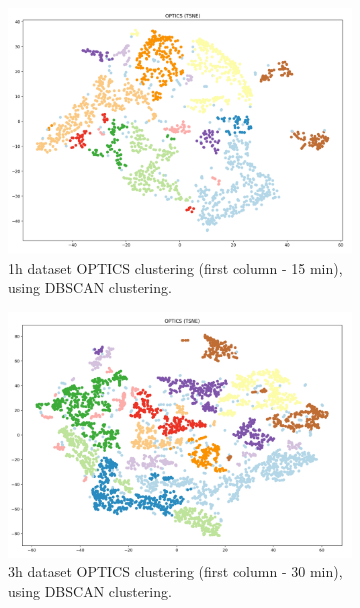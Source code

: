 \begin{figure}[H]
  \centering
  \begin{subfigure}{.5\textwidth}\captionsetup{width=.8\linewidth}
    \centering
    \includegraphics[width=1\textwidth]{./images/clusteringResults/1h-1-OPTICS.png}
  \caption{1h dataset OPTICS clustering (first column - 15 min), using DBSCAN clustering.}
  \end{subfigure}%
  \hfill
  \begin{subfigure}{.5\textwidth}\captionsetup{width=.8\linewidth}
    \centering
    \includegraphics[width=1\textwidth]{./images/clusteringResults/3h-1-OPTICS.png}
    \caption{3h dataset OPTICS clustering (first column - 30 min), using DBSCAN clustering.}
  \end{subfigure}
  \caption{}
  \label{figure:OPTICSResults}
  \end{figure}

